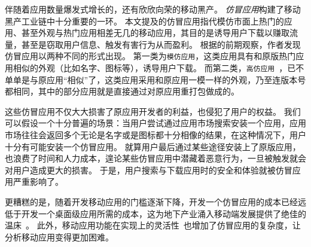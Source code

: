伴随着应用数量爆发式增长的，还有欣欣向荣的移动黑产。
\emph{仿冒应用}构建了移动黑产工业链中十分重要的一环。
本文提及的仿冒应用指代模仿市面上热门的应用、甚至外观与热门应用相差无几的移动应用，其目的是诱导用户下载以赚取流量，甚至是窃取用户信息、触发有害行为从而盈利。
根据的前期观察，作者发现仿冒应用以两种不同的形式出现。
第一类为\texttt{模仿应用}，这类应用具有和原版热门应用相似的外观（比如名字、图标等），诱导用户下载。
而第二类，\texttt{高仿应用}~\cite{Andow2016ASO, luo2016repackage}，已不单单是与原应用``相似''了，这类应用采用和原应用一模一样的外观，乃至连版本号都相同，其中的部分应用就是直接通过对原应用重打包做成的。

这些仿冒应用不仅大大损害了原应用开发者的利益，也侵犯了用户的权益。
我们可以假设一个十分普遍的场景：当用户尝试通过应用市场搜索安装一个应用，应用市场往往会返回多个无论是名字或是图标都十分相像的结果，在这种情况下，用户十分有可能安装一个仿冒应用。
就算用户最后通过某些途径安装上了原版应用，也浪费了时间和人力成本，遑论某些仿冒应用中潜藏着恶意行为，一旦被触发就会对用户造成更大的损害。
于是，用户搜索与下载应用时的安全和体验就被仿冒应用严重影响了。

更糟糕的是，随着开发移动应用的门槛逐渐下降，开发一个仿冒应用的成本已经远低于开发一个桌面级应用所需的成本，这为地下产业涌入移动端发展提供了绝佳的温床~\cite{wasserman2010software}。
此外，移动应用功能在实现上的灵活性~\cite{storydroid}也增加了仿冒应用的复杂度，让分析移动应用变得更加困难。

